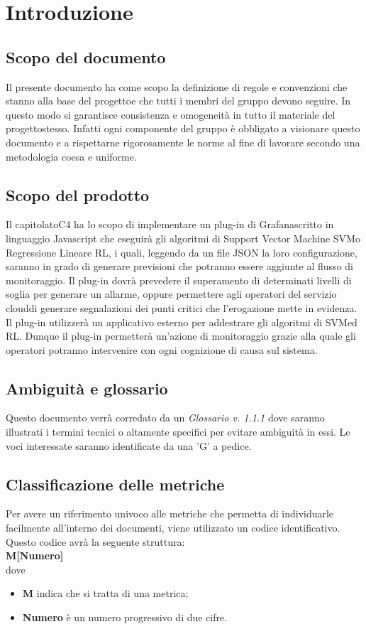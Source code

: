 \section{Introduzione}
\subsection{Scopo del documento}
Il presente documento ha come scopo la definizione di regole e convenzioni che stanno alla base del progetto\glosp e che tutti i membri del gruppo devono seguire. In questo modo si garantisce consistenza e omogeneità in tutto il materiale del progetto\glosp stesso. Infatti ogni componente del gruppo è obbligato a visionare questo documento e a rispettarne rigorosamente le norme al fine di lavorare secondo una metodologia coesa e uniforme.
\subsection{Scopo del prodotto}
Il capitolato\glosp C4 ha lo scopo di implementare un plug-in di Grafana\glosp scritto in linguaggio Javascript che eseguirà gli algoritmi di Support Vector Machine SVM\glosp o Regressione Lineare RL\glo, i quali, leggendo da un file JSON la loro configurazione, saranno in grado di generare previsioni che potranno essere aggiunte al flusso di monitoraggio. Il plug-in dovrà prevedere il superamento di determinati livelli di soglia per generare un allarme, oppure permettere agli operatori del servizio cloud\glosp di generare segnalazioni dei punti critici che l'erogazione mette in evidenza. Il plug-in utilizzerà un applicativo esterno per addestrare gli algoritmi di SVM\glosp ed RL\glo.
Dunque il plug-in permetterà un'azione di monitoraggio grazie alla quale gli operatori potranno intervenire con ogni cognizione di causa sul sistema.
\subsection{Ambiguità e glossario}
Questo documento verrà corredato da un \textit{Glossario v. 1.1.1} dove saranno illustrati i termini tecnici o altamente specifici per evitare ambiguità in essi. Le voci interessate saranno identificate da una 'G' a pedice.
\subsection{Classificazione delle metriche}
Per avere un riferimento univoco alle metriche che permetta di individuarle facilmente all'interno dei documenti, viene utilizzato un codice identificativo. Questo codice avrà la seguente struttura: \\
\textbf{M[Numero]} \\
dove 
\begin{itemize}
	\item \textbf{M} indica che si tratta di una metrica;
	\item \textbf{Numero} è un numero progressivo di due cifre.
\end{itemize}
